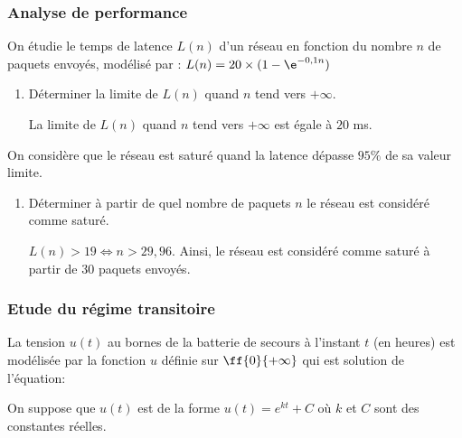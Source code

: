     \subsubsection*{Analyse de performance}

    On étudie le temps de latence $L(n)$ d'un réseau en fonction du nombre $n$ de paquets envoyés, modélisé par : $L(n)=20\times(1-\e^{-0,1n})$
    
    \begin{enumerate}[resume=monDS]
        \item Déterminer la limite de $L(n)$ quand $n$ tend vers $+\infty$.
            \begin{blocvisiblex}[height=1.5]
    {\quad}
    La limite de $L(n)$ quand $n$ tend vers $+\infty$ est égale à $20$ ms.
    \end{blocvisiblex}
        \medskip
    \end{enumerate}
         On considère que le réseau est saturé quand la latence dépasse $95\%$ de sa valeur limite.

            \begin{enumerate}[resume=monDS]

    \item Déterminer à partir de quel nombre de paquets $n$ le réseau est considéré comme saturé.
    \begin{blocvisiblex}[height=1.]
    {\quad}
    $L(n)>19 \Leftrightarrow n>29,96$.
    Ainsi, le réseau est considéré comme saturé à partir de 30 paquets envoyés.
    \end{blocvisiblex}
    \end{enumerate}

    
\subsubsection*{Etude du régime transitoire}

La tension $u(t)$ au bornes de la batterie de secours à l'instant $t$ (en heures) est modélisée par la fonction $u$ définie sur $\ff{0}{+\infty}$ qui est solution de l'équation: 

On suppose que $u(t)$ est de la forme $u(t)=e^{kt}+C$ où $k$ et $C$ sont des constantes réelles.


